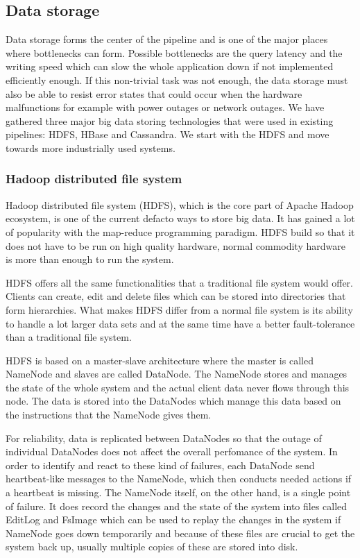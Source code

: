 \subsection{Data storage}

Data storage forms the center of the pipeline and is one of the major places where bottlenecks can form.
Possible bottlenecks are the query latency and the writing speed which can slow the whole application down if not implemented efficiently enough.
If this non-trivial task was not enough, the data storage must also be able to resist error states that could occur when the hardware malfunctions for example with power outages or network outages.
We have gathered three major big data storing technologies that were used in existing pipelines: HDFS, HBase and Cassandra.
We start with the HDFS and move towards more industrially used systems.

\subsubsection{Hadoop distributed file system}

Hadoop distributed file system (HDFS), which is the core part of Apache Hadoop ecosystem, is one of the current defacto ways to store big data.
It has gained a lot of popularity with the map-reduce programming paradigm.
HDFS build so that it does not have to be run on high quality hardware, normal commodity hardware is more than enough to run the system.\cite{hdfs}

HDFS offers all the same functionalities that a traditional file system would offer.
Clients can create, edit and delete files which can be stored into directories that form hierarchies.
What makes HDFS differ from a normal file system is its ability to handle a lot larger data sets and at the same time have a better fault-tolerance than a traditional file system.\cite{hdfs}

HDFS is based on a master-slave architecture where the master is called NameNode and slaves are called DataNode.
The NameNode stores and manages the state of the whole system and the actual client data never flows through this node.
The data is stored into the DataNodes which manage this data based on the instructions that the NameNode gives them.\cite{hdfs}

For reliability, data is replicated between DataNodes so that the outage of individual DataNodes does not affect the overall perfomance of the system.
In order to identify and react to these kind of failures, each DataNode send heartbeat-like messages to the NameNode, which then conducts needed actions if a heartbeat is missing.
The NameNode itself, on the other hand, is a single point of failure.
It does record the changes and the state of the system into files called EditLog and FsImage which can be used to replay the changes in the system if NameNode goes down temporarily and because of these files are crucial to get the system back up, usually multiple copies of these are stored into disk. \cite{hdfs}

